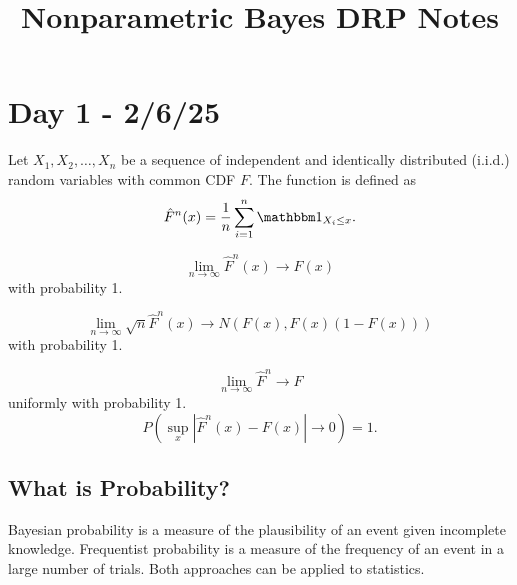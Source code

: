 \documentclass{chaistyle}
\title{Nonparametric Bayes DRP Notes}
\begin{document}
\maketitle
\tableofcontents
\newpage
{}
\section*{Day 1 - 2/6/25}
\begin{definition*}
    Let \(X_1, X_2, \dots, X_n\) be a sequence of independent and identically distributed (i.i.d.) random variables with common CDF \(F\). The  function is defined as \[\hat F^n(x)=\frac{1}{n} \sum_{i=1}^n\indic_{X_i\leq x}.\]
\end{definition*}
\begin{theorem*}
    \[\lim_{n \to \infty} \hat F^n(x)\to F(x)\] with probability 1.
\end{theorem*}
\begin{theorem*}
    \[\lim_{n \to \infty} \sqrt n \hat F^n(x)\to N(F(x),F(x)(1-F(x)))\] with probability 1.
\end{theorem*}
\begin{theorem*}
    \[\lim_{n \to \infty} \hat F^n\to F\] uniformly with probability 1. \[P(\sup_x|\hat F^n(x)-F(x)|\to 0)=1.\]
\end{theorem*}
\subsection*{What is Probability?}
Bayesian probability is a measure of the plausibility of an event given incomplete knowledge. Frequentist probability is a measure of the frequency of an event in a large number of trials. Both approaches can be applied to statistics.
\end{document}
